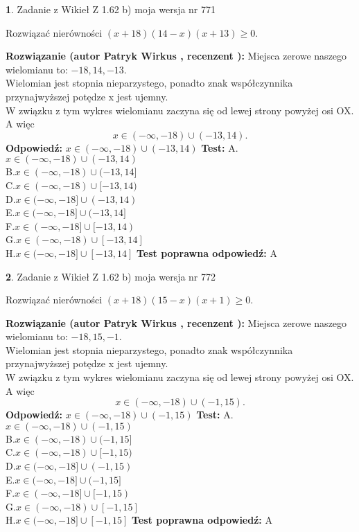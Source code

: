 \documentclass[12pt, a4paper]{article}
\theoremstyle{definition} %
\newtheorem{zad}{}
\newcommand{\zadStart}[1]{\begin{zad}#1\newline}
\newcommand{\zadStop}{\end{zad}}
\newcommand{\rozwStart}[2]{\noindent \textbf{Rozwiązanie (autor #1 , recenzent #2): }\newline}
\newcommand{\rozwStop}{\newline}
\newcommand{\odpStart}{\noindent \textbf{Odpowiedź:}\newline}
\newcommand{\odpStop}{\newline}
\newcommand{\testStart}{\noindent \textbf{Test:}\newline}
\newcommand{\testStop}{\newline}
\newcommand{\kluczStart}{\noindent \textbf{Test poprawna odpowiedź:}\newline}
\newcommand{\kluczStop}{\newline}
\begin{document}
\zadStart{Zadanie z Wikieł Z 1.62 b) moja wersja nr 771}

Rozwiązać nierówności $(x+18)(14-x)(x+13)\ge0$.
\zadStop
\rozwStart{Patryk Wirkus}{}
Miejsca zerowe naszego wielomianu to: $-18, 14, -13$.\\
Wielomian jest stopnia nieparzystego, ponadto znak współczynnika przy\linebreak najwyższej potędze x jest ujemny.\\ W związku z tym wykres wielomianu zaczyna się od lewej strony powyżej osi OX. A więc $$x \in (-\infty,-18) \cup (-13,14).$$
\rozwStop
\odpStart
$x \in (-\infty,-18) \cup (-13,14)$
\odpStop
\testStart
A.$x \in (-\infty,-18) \cup (-13,14)$\\
B.$x \in (-\infty,-18) \cup (-13,14]$\\
C.$x \in (-\infty,-18) \cup [-13,14)$\\
D.$x \in (-\infty,-18] \cup (-13,14)$\\
E.$x \in (-\infty,-18] \cup (-13,14]$\\
F.$x \in (-\infty,-18] \cup [-13,14)$\\
G.$x \in (-\infty,-18) \cup [-13,14]$\\
H.$x \in (-\infty,-18] \cup [-13,14]$
\testStop
\kluczStart
A
\kluczStop



\zadStart{Zadanie z Wikieł Z 1.62 b) moja wersja nr 772}

Rozwiązać nierówności $(x+18)(15-x)(x+1)\ge0$.
\zadStop
\rozwStart{Patryk Wirkus}{}
Miejsca zerowe naszego wielomianu to: $-18, 15, -1$.\\
Wielomian jest stopnia nieparzystego, ponadto znak współczynnika przy\linebreak najwyższej potędze x jest ujemny.\\ W związku z tym wykres wielomianu zaczyna się od lewej strony powyżej osi OX. A więc $$x \in (-\infty,-18) \cup (-1,15).$$
\rozwStop
\odpStart
$x \in (-\infty,-18) \cup (-1,15)$
\odpStop
\testStart
A.$x \in (-\infty,-18) \cup (-1,15)$\\
B.$x \in (-\infty,-18) \cup (-1,15]$\\
C.$x \in (-\infty,-18) \cup [-1,15)$\\
D.$x \in (-\infty,-18] \cup (-1,15)$\\
E.$x \in (-\infty,-18] \cup (-1,15]$\\
F.$x \in (-\infty,-18] \cup [-1,15)$\\
G.$x \in (-\infty,-18) \cup [-1,15]$\\
H.$x \in (-\infty,-18] \cup [-1,15]$
\testStop
\kluczStart
A
\kluczStop
\end{document}
